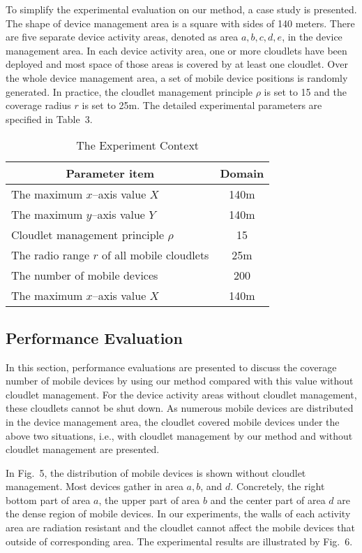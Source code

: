 \documentclass{llncs}
\begin{document}
To simplify the experimental evaluation on our method, a case study is presented. The shape of device management area is a square with sides of 140 meters. There are five separate device activity areas, denoted as area $a, b, c, d, e$, in the device management area. In each device activity area, one or more cloudlets have been deployed and most space of those areas is covered by at least one cloudlet. Over the whole device management area, a set of mobile device positions is randomly generated. In practice, the cloudlet management principle $\rho$ is set to 15 and the coverage radius $r$ is set to 25m. The detailed experimental parameters are specified in Table~3.

\begin{table}
\caption{The Experiment Context}
\begin{center}
\begin{tabular}{l|c}
\hline
\multicolumn{1}{c|}{\textbf{Parameter item}} & \textbf{Domain}\\
\hline
The maximum $x$--axis value $X$ & 140m\\
\hline
The maximum $y$--axis value $Y$ & 140m\\
\hline
Cloudlet management principle $\rho$ & 15\\
\hline
The radio range $r$ of all mobile cloudlets & 25m\\
\hline
The number of mobile devices & 200\\
\hline
The maximum $x$--axis value $X$ & 140m\\
\hline
\end{tabular}
\end{center}
\end{table}

\subsection{Performance Evaluation}

In this section, performance evaluations are presented to discuss the coverage number of mobile devices by using our method compared with this value without cloudlet management. For the device activity areas without cloudlet management, these cloudlets cannot be shut down. As numerous mobile devices are distributed in the device management area, the cloudlet covered mobile devices under the above two situations, i.e., with cloudlet management by our method and without cloudlet management are presented.

In Fig.~5, the distribution of mobile devices is shown without cloudlet management. Most devices gather in area $a, b$, and $d$. Concretely, the right bottom part of area $a$, the upper part of area $b$ and the center part of area $d$ are the dense region of mobile devices. In our experiments, the walls of each activity area are radiation resistant and the cloudlet cannot affect the mobile devices that outside of corresponding area. The experimental results are illustrated by Fig.~6.
\end{document}
